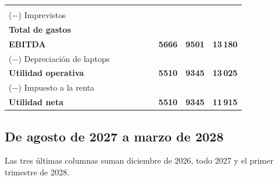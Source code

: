\documentclass[10.5pt,a4paper]{article}
\begin{document}
{\begin{tabular}{@{}l*{8}{R}@{}}
 & {\color{tenue}} & {\color{tenue}} & {\color{tenue}} & {\color{tenue}} & {\color{tenue}} & {\color{tenue}} & {\color{tenue}} & {\color{tenue}} \\
(−) Imprevistos &  &  &  &  &  &  &  &  \\
\textbf{Total de gastos} & \textbf{} & \textbf{} & \textbf{} & \textbf{} & \textbf{} & \textbf{} & \textbf{} & \textbf{} \\
\textbf{EBITDA} & \textbf{} & \textbf{} & \textbf{} & \textbf{} & \textbf{} & \textbf{5666} & \textbf{9501} & \textbf{13\,180} \\
(−) Depreciación de laptops &  &  &  &  &  &  &  &  \\
\textbf{Utilidad operativa} & \textbf{} & \textbf{} & \textbf{} & \textbf{} & \textbf{} & \textbf{5510} & \textbf{9345} & \textbf{13\,025} \\
(−) Impuesto a la renta &  &  &  &  &  &  &  &  \\
\midrule
\textbf{Utilidad neta} & \textbf{} & \textbf{} & \textbf{} & \textbf{} & \textbf{} & \textbf{5510} & \textbf{9345} & \textbf{11\,915} \\
\bottomrule
\end{tabular}}

\newpage
\subsection{De agosto de 2027 a marzo de 2028}

Las tres últimas columnas suman diciembre de 2026, todo 2027 y el primer trimestre de 2028.
\end{document}

